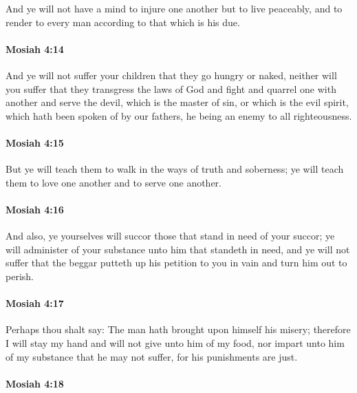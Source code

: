 			And ye will not have a mind to injure one another but to live peaceably,
			and to render to every man according to that which is his due.

		\paragraph{Mosiah 4:14} %
			\label{MOSIAH-4-14}

			And ye will not suffer your children that they go hungry or naked,
			neither will you suffer that they transgress the laws of God
			and fight and quarrel one with another
			and serve the devil, which is the master of sin,
			or which is the evil spirit, which hath been spoken of by our fathers,
			he being an enemy to all righteousness.

		\paragraph{Mosiah 4:15} %
			\label{MOSIAH-4-15}

			But ye will teach them to walk in the ways of truth and soberness;
			ye will teach them to love one another and to serve one another.

		\paragraph{Mosiah 4:16} %
			\label{MOSIAH-4-16}

			And also, ye yourselves will succor those that stand in need of your succor;
			ye will administer of your substance unto him that standeth in need,
			and ye will not suffer that the beggar putteth up his petition to you in vain
			and turn him out to perish.

		\paragraph{Mosiah 4:17} %
			\label{MOSIAH-4-17}

			Perhaps thou shalt say:
			The man hath brought upon himself his misery;
			therefore I will stay my hand and will not give unto him of my food,
			nor impart unto him of my substance that he may not suffer,
			for his punishments are just.

		\paragraph{Mosiah 4:18} %
			\label{MOSIAH-4-18}

